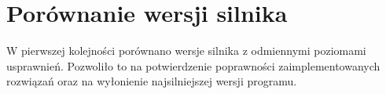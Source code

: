 \section {Porównanie wersji silnika}
\label {sec: porownanie-wersji-silnika}

W pierwszej kolejności porównano wersje silnika z odmiennymi poziomami usprawnień.
Pozwoliło to na potwierdzenie poprawności zaimplementowanych rozwiązań oraz na wyłonienie najsilniejszej wersji programu.


%